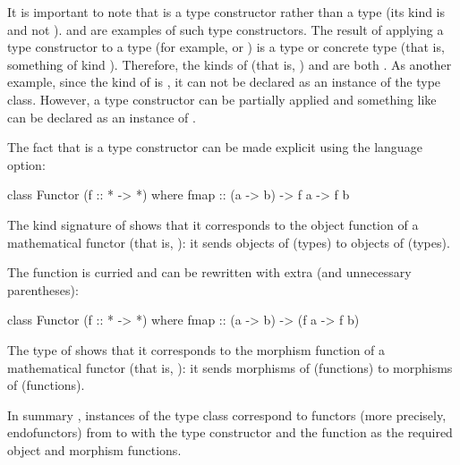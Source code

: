 
It is important to note that  is a type constructor
rather than a type (its kind is \texthaskell{* -> *} and not
\texthaskell{*}). \texthaskell{[]} and  are
examples of such type constructors. The result of applying a type
constructor to a type (for example,  or
) is a type or concrete type (that is, something of
kind \texthaskell{*}). Therefore, the kinds of 
(that is, \texthaskell{[Int]}) and  are both
\texthaskell{*}. As another example, since the kind of
 is \texthaskell{* -> * -> *}, it can not be
declared as an instance of the  type class.
However, a type constructor can be partially applied and something
like  can be declared as an instance of
.

The fact that  is a type constructor can be made
explicit using the  language option:
\begin{codehaskell}
class Functor (f :: * -> *) where
  fmap :: (a -> b) -> f a -> f b
\end{codehaskell}
The kind signature of  shows that it corresponds to the
object function of a mathematical functor (that is, ): it
sends objects of \hask (types) to objects of \hask (types).

The  function is curried and can be rewritten with
extra (and unnecessary parentheses):
\begin{codehaskell}
class Functor (f :: * -> *) where
  fmap :: (a -> b) -> (f a -> f b)
\end{codehaskell}
The type of  shows that it corresponds to the
morphism function of a mathematical functor (that is, ): it
sends morphisms of \hask (functions) to morphisms of \hask
(functions).

In summary , instances of the
 type class correspond to functors (more
precisely, endofunctors) from \hask to \hask with the type constructor
and the  function as the required object and
morphism functions.

